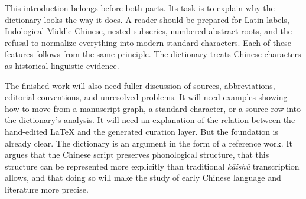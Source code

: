 This introduction belongs before both parts. Its task is to explain why the dictionary looks the way it does. A reader should be prepared for Latin labels, Indological Middle Chinese, nested subseries, numbered abstract roots, and the refusal to normalize everything into modern standard characters. Each of these features follows from the same principle. The dictionary treats Chinese characters as historical linguistic evidence.

The finished work will also need fuller discussion of sources, abbreviations, editorial conventions, and unresolved problems. It will need examples showing how to move from a manuscript graph, a standard character, or a source row into the dictionary's analysis. It will need an explanation of the relation between the hand-edited LaTeX and the generated curation layer. But the foundation is already clear. The dictionary is an argument in the form of a reference work. It argues that the Chinese script preserves phonological structure, that this structure can be represented more explicitly than traditional \emph{kǎishū} transcription allows, and that doing so will make the study of early Chinese language and literature more precise.
